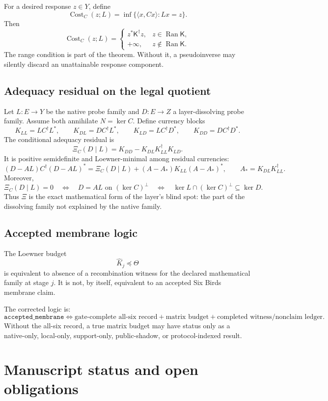 \documentclass[11pt]{article}
\DeclareMathOperator{\range}{Ran}
\DeclareMathOperator{\Cost}{Cost}
\newcommand{\K}{\mathsf K}
\begin{document}
For a desired response \(z\in Y\), define
\[
  \Cost_C(z;L)=\inf\{\langle x,Cx\rangle:Lx=z\}.
\]
Then
\[
  \Cost_C(z;L)=
  \begin{cases}
  z^*\K^\dagger z, & z\in\range \K,\\
  +\infty, & z\notin\range \K.
  \end{cases}
\]
The range condition is part of the theorem.  Without it, a pseudoinverse may silently discard an unattainable response component.

\subsection{Adequacy residual on the legal quotient}
Let \(L:E\to Y\) be the native probe family and \(D:E\to Z\) a layer-dissolving probe family.  Assume both annihilate \(N=\ker C\).  Define currency blocks
\[
K_{LL}=LC^\dagger L^*,\qquad K_{DL}=DC^\dagger L^*,\qquad K_{LD}=LC^\dagger D^*,\qquad K_{DD}=DC^\dagger D^*.
\]
The conditional adequacy residual is
\[
  \boxed{\Xi_C(D\mid L)=K_{DD}-K_{DL}K_{LL}^\dagger K_{LD}.}
\]
It is positive semidefinite and Loewner-minimal among residual currencies:
\[
  (D-AL)C^\dagger(D-AL)^*
  =
  \Xi_C(D\mid L)+(A-A_*)K_{LL}(A-A_*)^*,
  \qquad A_*=K_{DL}K_{LL}^\dagger.
\]
Moreover,
\[
  \Xi_C(D\mid L)=0
  \quad\Longleftrightarrow\quad
  D=A L\text{ on }(\ker C)^\perp
  \quad\Longleftrightarrow\quad
  \ker L\cap(\ker C)^\perp\subseteq\ker D.
\]
Thus \(\Xi\) is the exact mathematical form of the layer's blind spot: the part of the dissolving family not explained by the native family.

\subsection{Accepted membrane logic}
The Loewner budget
\[
  \widehat K_j\preceq\Theta
\]
is equivalent to absence of a recombination witness for the declared mathematical family at stage \(j\).  It is not, by itself, equivalent to an accepted Six Birds membrane claim.

The corrected logic is:
\[
\boxed{
\texttt{accepted\_membrane}
\iff
\text{gate-complete all-six record}
+
\text{matrix budget}
+
\text{completed witness/nonclaim ledger}.
}
\]
Without the all-six record, a true matrix budget may have status only as a native-only, local-only, support-only, public-shadow, or protocol-indexed result.

\section{Manuscript status and open obligations}
\end{document}
